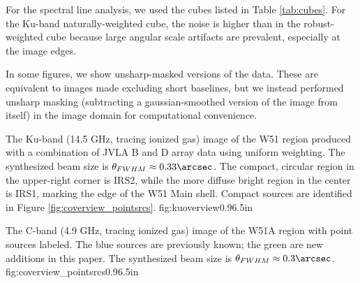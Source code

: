 For the spectral line analysis, we used the cubes listed in Table
\ref{tab:cubes}.  For the Ku-band naturally-weighted cube, the noise is higher
than in the robust-weighted cube because large angular scale artifacts are
prevalent, especially at the image edges.

In some figures, we show unsharp-masked versions of the data.  These are
equivalent to images made excluding short baselines, but we instead performed
unsharp masking (subtracting a gaussian-smoothed version of the image from
itself) in the image domain for computational convenience.



{The Ku-band (14.5 GHz, tracing ionized gas) image of the W51 region produced
with a combination of JVLA B and D array data using uniform weighting.  The
synthesized beam size is
$\theta_{FWHM}\approx0.33\arcsec$.
The compact, circular region in the upper-right corner is IRS2, while the more
diffuse bright region in the center is IRS1, marking the edge of the W51 Main
shell.  Compact sources are identified
in Figure \ref{fig:coverview_pointsrcs}.
}
{fig:kuoverview}{0.9}{6.5in}

{The C-band (4.9 GHz, tracing ionized gas) image of the W51A region with point sources labeled.  The
blue sources are previously known; the green are new additions in this paper.
The synthesized beam size is $\theta_{FWHM}\approx0.3\arcsec$.
}
{fig:coverview_pointsrcs}{0.9}{6.5in}


